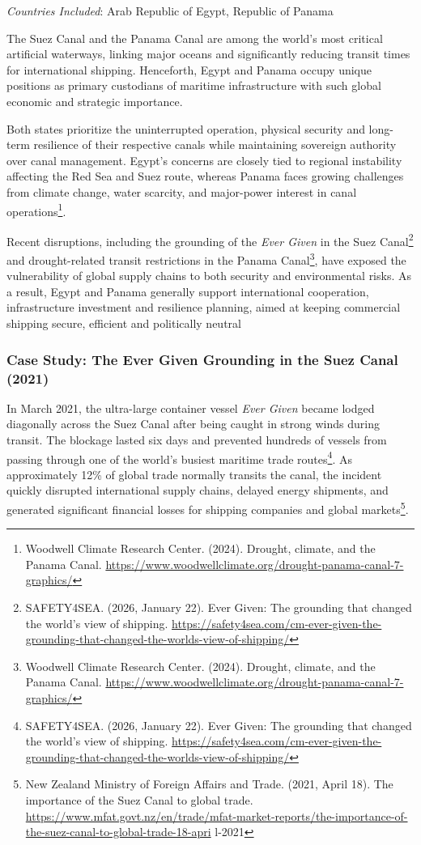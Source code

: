 
\emph{Countries Included}: Arab Republic of Egypt, Republic of Panama

The Suez Canal and the Panama Canal are among the world's most critical artificial waterways, linking major oceans and significantly reducing transit times for international shipping. Henceforth, Egypt and Panama occupy unique positions as primary custodians of maritime infrastructure with such global economic and strategic importance.

Both states prioritize the uninterrupted operation, physical security and long-term resilience of their respective canals while maintaining sovereign authority over canal management. Egypt's concerns are closely tied to regional instability affecting the Red Sea and Suez route, whereas Panama faces growing challenges from climate change, water scarcity, and major-power interest in canal operations\footnote{Woodwell Climate Research Center. (2024). Drought, climate, and the Panama Canal. \url{https://www.woodwellclimate.org/drought-panama-canal-7-graphics/}}.

Recent disruptions, including the grounding of the \emph{Ever Given} in the Suez Canal\footnote{SAFETY4SEA. (2026, January 22). Ever Given: The grounding that changed the world's view of shipping. \url{https://safety4sea.com/cm-ever-given-the-grounding-that-changed-the-worlds-view-of-shipping/}} and drought-related transit restrictions in the Panama Canal\footnote{Woodwell Climate Research Center. (2024). Drought, climate, and the Panama Canal. \url{https://www.woodwellclimate.org/drought-panama-canal-7-graphics/}}, have exposed the vulnerability of global supply chains to both security and environmental risks. As a result, Egypt and Panama generally support international cooperation, infrastructure investment and resilience planning, aimed at keeping commercial shipping secure, efficient and politically neutral

\subsubsection{Case Study: The Ever Given Grounding in the Suez Canal (2021)}

In March 2021, the ultra-large container vessel \emph{Ever Given} became lodged diagonally across the Suez Canal after being caught in strong winds during transit. The blockage lasted six days and prevented hundreds of vessels from passing through one of the world's busiest maritime trade routes\footnote{SAFETY4SEA. (2026, January 22). Ever Given: The grounding that changed the world's view of shipping. \url{https://safety4sea.com/cm-ever-given-the-grounding-that-changed-the-worlds-view-of-shipping/}}. As approximately 12\% of global trade normally transits the canal, the incident quickly disrupted international supply chains, delayed energy shipments, and generated significant financial losses for shipping companies and global markets\footnote{New Zealand Ministry of Foreign Affairs and Trade. (2021, April 18). The importance of the Suez Canal to global trade. \url{https://www.mfat.govt.nz/en/trade/mfat-market-reports/the-importance-of-the-suez-canal-to-global-trade-18-apri} l-2021}.

